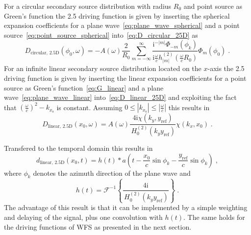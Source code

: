 \documentclass[a4paper]{book}
\newcommand{\I}{\mathrm{i}}                          %
\newcommand{\omegac}{\frac{\omega}{c}}               %
\renewcommand{\H}[2]{\,H_{#1}^{(#2)}\!}              %
\newcommand{\IFT}[1]{%
    \mathcal{F}^{-1}\left\{#1\right\}}%
\newcommand{\qc}{\;,}                                             %
\newcommand{\qp}{\;.}                                             %
\def \twohalfD {{2.5\text{D}}\xspace}                             %
\newcommand\eqlabel[2][]{%
  \label{eq:#2}%
}
\begin{document}
{For a circular secondary source distribution with radius $R_0$ and point source
as Green's function the \twohalfD driving function is given by inserting the
spherical expansion coefficients for a plane wave~\eqref{eq:plane_wave_spherical}
and a point source~\eqref{eq:point_source_spherical} into~\eqref{eq:D_circular_25D} as
%
\begin{equation}
    D_{\text{circular},\,\twohalfD}(\phi_0,\omega) = -A(\omega) \frac{2}{R_0}
    \sum_{m=-\infty}^\infty \frac{\I^{-|m|} \Phi_{-m}(\phi_k)} {\I\omegac
    h_{|m|}^{(2)}\left(\omegac R_0\right)} \Phi_m(\phi_0) \qp
    \eqlabel{D:hoa:pw:2.5D}
\end{equation}
%
For an infinite linear secondary source distribution located on the $x$-axis the
\twohalfD driving function is given by inserting the linear expansion coefficients
for a point source as Green's function~\eqref{eq:G_linear} and
a plane wave~\eqref{eq:plane_wave_linear} into~\eqref{eq:D_linear_25D} and
exploiting the fact that $(\frac{\omega}{c})^2 - k_{x_\text{s}}$ is constant. Assuming
$0 \le |k_{x_\text{s}}| \le |\omegac|$ this results
in\cite[][(17)]{Ahrens2010a}
%
\begin{equation}
    D_{\text{linear},\,\twohalfD}(x_0,\omega) = A(\omega) \frac{4\I
    \chi(k_y,y_\text{ref})}
    {\H{0}{2}(k_y y_\text{ref})} \chi(k_x,x_0) \qp
    \eqlabel{D:sdm:pw:2.5D}
\end{equation}
%

Transfered to the temporal domain this results
in\cite[][(18)]{Ahrens2010a}
%
\begin{equation}
    d_{\text{linear},\,\twohalfD}(x_0,t) = h(t) *
    a(t-\frac{x_0}{c}\sin\phi_k-\frac{y_\text{ref}}{c}\sin\phi_k)
    \qc
    \label{eq:d_sdm_pw_25D}
\end{equation}
%
where $\phi_k$ denotes the azimuth direction of the plane wave and
\begin{equation}
    h(t) =
    \IFT{\frac{4\I}{\H{0}{2}(k_y y_\text{ref})}} \qp
\end{equation}
The advantage of this
result is that it can be implemented by a simple weighting and delaying of
the signal, plus one convolution with $h(t)$. The same holds for the driving
functions of WFS as presented in the next section.


}
\end{document}
